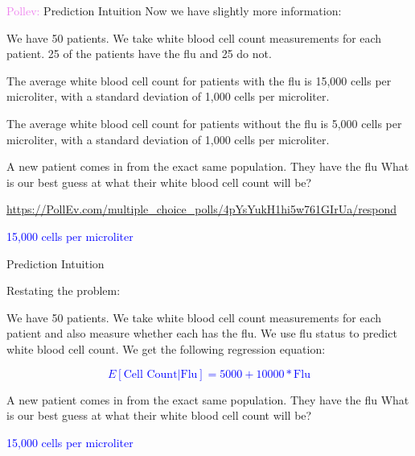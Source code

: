 \documentclass[10pt,t]{beamer}
\begin{document}
\begin{frame}{\textcolor{violet}{Pollev:} Prediction Intuition}
	\vspace{-5 mm}
	Now we have slightly more information:
	
	\medskip
	
	We have 50 patients. We take white blood cell count measurements for each patient. 25 of the patients have the flu and 25 do not. 
	
	\medskip
	
	The average white blood cell count for patients with the flu is 15,000 cells per microliter, with a standard deviation of 1,000 cells per microliter.
	\medskip
	
	The average white blood cell count for patients without the flu is 5,000 cells per microliter, with a standard deviation of 1,000 cells per microliter.
	\medskip
	
	A new patient comes in from the exact same population. They have the flu What is our best guess at what their white blood cell count will be?
	
		\smallskip
	
	\url{https://PollEv.com/multiple_choice_polls/4pYsYukH1hi5w761GIrUa/respond}
	\pause
	
	\bigskip
	
	\textcolor{blue}{15,000 cells per microliter}
	
	
\end{frame}

\begin{frame}{Prediction Intuition}
	
	Restating the problem:
	
	\medskip
	
	We have 50 patients. We take white blood cell count measurements for each patient and also measure whether each has the flu. We use flu status to predict white blood cell count. We get the following regression equation:
	
	\medskip
	
\textcolor{blue}{	\[E[\text{Cell Count}|\text{Flu}]=5000+10000*\text{Flu}\]}
	\medskip
	
	A new patient comes in from the exact same population. They have the flu What is our best guess at what their white blood cell count will be?
	
	\bigskip
	
	\textcolor{blue}{15,000 cells per microliter}
	
	
\end{frame}
\end{document}
